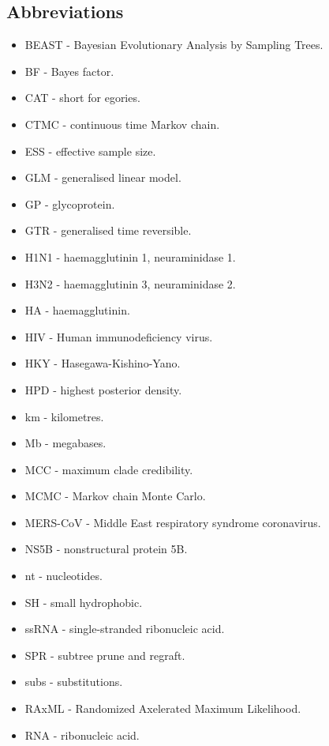 \documentclass{bmcart}
\begin{document}

\begin{backmatter}

\section*{Abbreviations}
\begin{itemize}
  \item BEAST - Bayesian Evolutionary Analysis by Sampling Trees.
  \item BF - Bayes factor.
  \item CAT - short for egories.
  \item CTMC - continuous time Markov chain.
  \item ESS - effective sample size.
  \item GLM - generalised linear model.
  \item GP - glycoprotein.
  \item GTR - generalised time reversible.
  \item H1N1 - haemagglutinin 1, neuraminidase 1.
  \item H3N2 - haemagglutinin 3, neuraminidase 2.
  \item HA - haemagglutinin.
  \item HIV - Human immunodeficiency virus.
  \item HKY - Hasegawa-Kishino-Yano.
  \item HPD - highest posterior density.
  \item km - kilometres.
  \item Mb - megabases.
  \item MCC - maximum clade credibility.
  \item MCMC - Markov chain Monte Carlo.
  \item MERS-CoV - Middle East respiratory syndrome coronavirus.
  \item NS5B - nonstructural protein 5B.
  \item nt - nucleotides.
  \item SH - small hydrophobic.
  \item ssRNA - single-stranded ribonucleic acid.
  \item SPR - subtree prune and regraft.
  \item subs - substitutions.
  \item RAxML - Randomized Axelerated Maximum Likelihood.
  \item RNA - ribonucleic acid.
\end{itemize}


\end{backmatter}
\end{document}
